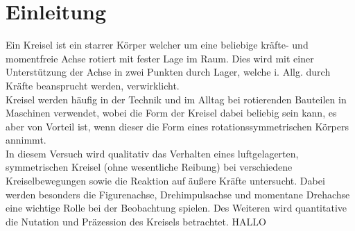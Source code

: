 


\chapter{Einleitung}


Ein Kreisel ist ein starrer Körper welcher um eine beliebige kräfte- und momentfreie Achse rotiert mit fester Lage im Raum.
Dies wird mit einer Unterstützung der Achse in zwei Punkten durch Lager, welche i. Allg. durch Kräfte beansprucht werden, 
verwirklicht. \\
Kreisel werden häufig in der Technik und im Alltag bei rotierenden Bauteilen in Maschinen verwendet, wobei die Form der Kreisel dabei 
beliebig sein kann, es aber von Vorteil ist, wenn dieser die Form eines rotationssymmetrischen Körpers annimmt.
\newline\\
In diesem Versuch wird qualitativ das Verhalten eines luftgelagerten, symmetrischen Kreisel (ohne wesentliche Reibung) bei
verschiedene Kreiselbewegungen sowie die Reaktion auf äußere Kräfte untersucht. Dabei werden besonders die Figurenachse, Drehimpulsachse 
und momentane Drehachse eine wichtige Rolle bei der Beobachtung spielen. Des Weiteren wird quantitative die Nutation und Präzession
des Kreisels betrachtet.
HALLO
